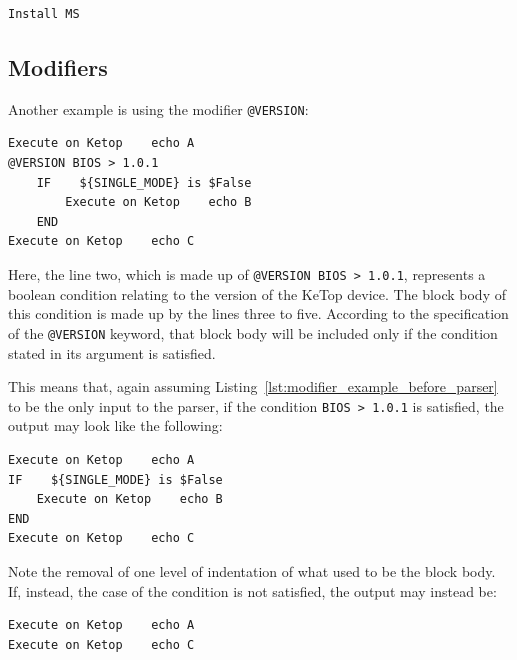 \begin{lstlisting}[caption={Parser result of Listing~\ref{lst:option_example_before_parser}.}, label={lst:option_example_after_parser}]
Install MS
\end{lstlisting}

\subsection{Modifiers}

Another example is using the modifier \verb|@VERSION|:

\begin{lstlisting}[caption=Example of a Modifier before parsing., label={lst:modifier_example_before_parser}]
Execute on Ketop    echo A
@VERSION BIOS > 1.0.1
    IF    ${SINGLE_MODE} is $False
        Execute on Ketop    echo B
    END
Execute on Ketop    echo C
\end{lstlisting}

Here, the line two, which is made up of \verb|@VERSION BIOS > 1.0.1|, represents a boolean condition relating to the version of the KeTop device. The block body of this condition is made up by the lines three to five. According to the specification of the \verb|@VERSION| keyword, that block body will be included only if the condition stated in its argument is satisfied.

This means that, again assuming Listing~\ref{lst:modifier_example_before_parser} to be the only input to the parser, if the condition \verb|BIOS > 1.0.1| is satisfied, the output may look like the following:

\begin{lstlisting}[caption={Parser result of Listing~\ref{lst:modifier_example_before_parser} if the condition is met.}, label={lst:modifier_example_after_parser_condition_met}]
Execute on Ketop    echo A
IF    ${SINGLE_MODE} is $False
    Execute on Ketop    echo B
END
Execute on Ketop    echo C
\end{lstlisting}

Note the removal of one level of indentation of what used to be the block body. If, instead, the case of the condition is not satisfied, the output may instead be:

\begin{lstlisting}[caption={Parser result of Listing~\ref{lst:modifier_example_before_parser} if the condition is not met.}, label={lst:modifier_example_after_parser_condition_not_met}]
Execute on Ketop    echo A
Execute on Ketop    echo C
\end{lstlisting}

